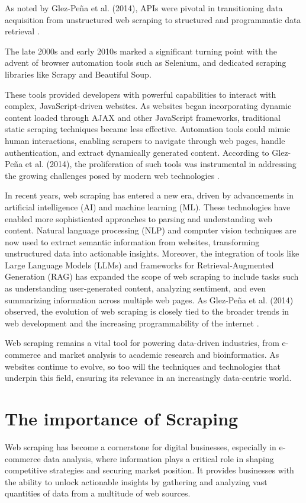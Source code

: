 As noted by Glez-Peña et al. (2014), APIs were pivotal in transitioning data acquisition from unstructured web scraping to structured and programmatic data retrieval \cite{1}.

The late 2000s and early 2010s marked a significant turning point with the advent of browser automation tools such as Selenium, and dedicated scraping libraries like Scrapy and Beautiful Soup. 

These tools provided developers with powerful capabilities to interact with complex, JavaScript-driven websites. As websites began incorporating dynamic content loaded through AJAX and other JavaScript frameworks, traditional static scraping techniques became less effective. Automation tools could mimic human interactions, enabling scrapers to navigate through web pages, handle authentication, and extract dynamically generated content. According to Glez-Peña et al. (2014), the proliferation of such tools was instrumental in addressing the growing challenges posed by modern web technologies \cite{1}.

In recent years, web scraping has entered a new era, driven by advancements in artificial intelligence (AI) and machine learning (ML). These technologies have enabled more sophisticated approaches to parsing and understanding web content. Natural language processing (NLP) and computer vision techniques are now used to extract semantic information from websites, transforming unstructured data into actionable insights. Moreover, the integration of tools like Large Language Models (LLMs) and frameworks for Retrieval-Augmented Generation (RAG) has expanded the scope of web scraping to include tasks such as understanding user-generated content, analyzing sentiment, and even summarizing information across multiple web pages. As Glez-Peña et al. (2014) observed, the evolution of web scraping is closely tied to the broader trends in web development and the increasing programmability of the internet \cite{1}.

Web scraping remains a vital tool for powering data-driven industries, from e-commerce and market analysis to academic research and bioinformatics. As websites continue to evolve, so too will the techniques and technologies that underpin this field, ensuring its relevance in an increasingly data-centric world.

\section{The importance of  Scraping}
Web scraping has become a cornerstone for digital businesses, especially in e-commerce data analysis, where information plays a critical role in shaping competitive strategies and securing market position. It provides businesses with the ability to unlock actionable insights by gathering and analyzing vast quantities of data from a multitude of web sources. 

